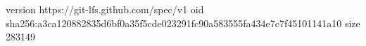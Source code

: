 version https://git-lfs.github.com/spec/v1
oid sha256:a3ca120882835d6bf0a35f5cde023291fc90a583555fa434e7c7f45101141a10
size 283149
